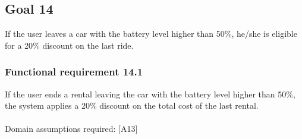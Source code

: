 \subsection{Goal 14}
If the user leaves a car with the battery level higher than 50\%, he/she is eligible for a 20\% discount on the last ride.

\setcounter{secnumdepth}{3}
\subsubsection{Functional requirement 14.1}
If the user ends a rental leaving the car with the battery level higher than 50\%, the system applies a 20\% discount on the total cost of the last rental.\\~\\
\noindent Domain assumptions required: [A13]
